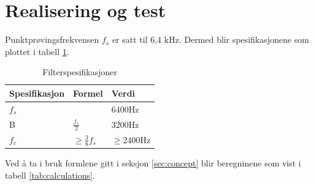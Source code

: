 \section{Realisering og test}
\label{sec:research}

Punktprøvingsfrekvensen $f_s$ er satt til 6,4 kHz. Dermed blir spesifikasjonene som plottet i tabell \ref{tab:spec}. 

\begin{table}[ht]
    \caption{Filterspesifikasjoner}
    \centering
    \begin{tabular}{lll}
        \hline
        Spesifikasjon & Formel                              & Verdi        \\ \hline
        $f_s$         &                                     & 6400Hz       \\ 
        B             & $\frac{f_s}{2}$                     & 3200Hz       \\ 
        $f_c$         & $\geq\frac{3}{8}f_s$                & $\geq$2400Hz \\ 
    \end{tabular}
    \label{tab:spec}
\end{table}

Ved å ta i bruk formlene gitt i seksjon \ref{sec:concept} blir beregninene som vist i tabell \ref{tab:calculations}.

